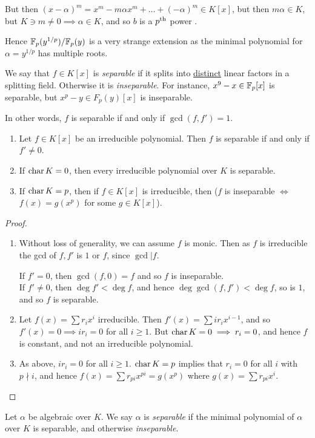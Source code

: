 \documentclass[10pt,a4paper]{article}
\begin{document}
But then $(x-\alpha)^m = x^m - m\alpha x^m + \ldots + (-\alpha)^m \in K[x]$, but then $m\alpha \in K$, but $K \ni m \neq 0 \implies \alpha \in K$, and so $b$ is a $p\textsuperscript{th}$ power \contr.

Hence $\mathbb{F}_p(y^{1/p}) / \mathbb{F}_p(y)$ is a very strange extension as the minimal polynomial for $\alpha = y^{1/p}$ has multiple roots.

We say that $f \in K[x]$ is \emph{separable} if it splits into \underline{distinct} linear factors in a splitting field. Otherwise it is \emph{inseparable}. For instance, $x^9-x \in \mathbb{F}_p[x]$ is separable, but $x^p-y \in F_p(y)[x]$ is inseparable.

In other words, $f$ is separable if and only if $\gcd(f,f') = 1$.
\begin{proposition}
\item
\begin{enumerate}
\item Let $f\in K[x]$ be an irreducible polynomial. Then $f$ is separable if and only if $f' \neq 0$.
\item If $\operatorname{char} K = 0$, then every irreducible polynomial over $K$ is separable.
\item If $\operatorname{char} K = p$, then if $f \in K[x]$ is irreducible, then ($f$ is inseparable $\iff$ $f(x) = g(x^p)$ for some $g \in K[x]$).
\end{enumerate}
\end{proposition}
\begin{proof}
\item
\begin{enumerate}
\item Without loss of generality, we can assume $f$ is monic. Then as $f$ is irreducible the gcd of $f, f'$ is $1$ or $f$, since $\gcd | f$.

If $f'=0$, then $\gcd(f,0) = f$ and so $f$ is inseparable.\\
If $f'\neq 0$, then $\deg f' < \deg f$, and hence $\deg\gcd(f,f')<\deg f$, so is $1$, and so $f$ is separable.
\item Let $f(x) = \sum r_i x^i$ irreducible. Then $f'(x) = \sum i r_i x^{i-1}$, and so $f'(x) = 0 \implies ir_i = 0$ for all $i\geq 1$. But $\operatorname{char} K = 0 \implies r_i = 0$, and hence $f$ is constant, and not an irreducible polynomial.

\item As above, $ir_i = 0$ for all $i\geq 1$. $\operatorname{char} K = p$ implies that $r_i = 0$ for all $i$ with $p\nmid i$, and hence $f(x) = \sum r_{pi}x^{pi} = g(x^p)$ where $g(x) = \sum r_{pi}x^i$.
\end{enumerate}
\end{proof}
Let $\alpha$ be algebraic over $K$. We say $\alpha$ is \emph{separable} if the minimal polynomial of $\alpha$ over $K$ is separable, and otherwise \emph{inseparable}.
\end{document}
